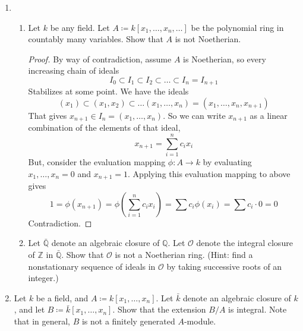 \documentclass[hidelinks,12pt]{article}
\newcommand{\Z}{\mathbb{Z}}
\newcommand{\Q}{\mathbb{Q}}
\renewcommand{\O}{\mathcal{O}}
\begin{document}
\begin{enumerate}
\begin{enumerate}[label=(\alph*).]
\begin{proof}
           \end{proof} 
            \item 
        \end{enumerate}
    \item \begin{enumerate}[label=(\alph*).]
        \item Let \(k\) be any field. Let \(A\coloneqq k[x_{1},\dots,x_{n},\dots]\) be the polynomial ring in countably many variables. Show that \(A\) is not Noetherian.
        \begin{proof}
            By way of contradiction, assume \(A\) is Noetherian, so every increasing chain of ideals \[
            I_{0}\subset I_{1}\subset I_{2}\subset\dots\subset I_{n}=I_{n+1}
            \]
            Stabilizes at some point. We have the ideals
            \[
                (x_{1})\subset(x_{1},x_{2})\subset\dots(x_{1},\dots,x_{n})=(x_{1},\dots,x_{n},x_{n+1})
            \]
            That gives \(x_{n+1}\in I_{n}=(x_{1},\dots,x_{n})\). So we can write \(x_{n+1}\) as a linear combination of the elements of that ideal,
            \[
                x_{n+1}=\sum_{i=1}^{n} c_{i}x_{i}
            \]
            But, consider the evaluation mapping \(\phi:A\to k\) by evaluating \(x_{1},\dots,x_{n}=0\) and \(x_{n+1}=1\). Applying this evaluation mapping to above gives \[
            1=\phi(x_{n+1})=\phi(\sum_{i=1}^{n} c_{i}x_{i})=\sum c_{i}\phi(x_{i})=\sum c_{i}\cdot0=0
            \]
           Contradiction. 
        \end{proof}
    \item Let \(\bar{\Q}\) denote an algebraic closure of \(\Q\). Let \(\O\) denote the integral closure of \(\Z\) in \(\bar{\Q}\). Show that \(\O\) is not a Noetherian ring. (Hint: find a nonstationary sequence of ideals in \(\O\) by taking successive roots of an integer.)
    \end{enumerate}
\item Let \(k\) be a field, and \(A\coloneqq k[x_{1},\dots,x_{n}]\). Let \(\bar{k}\) denote an algebraic closure of \(k\), and let \(B\coloneqq \bar{k}[x_{1},\dots,x_{n}]\). Show that the extension \(B/A\) is integral. Note that in general, \(B\) is not a finitely generated \(A\)-module.
\end{enumerate}
\end{document}
